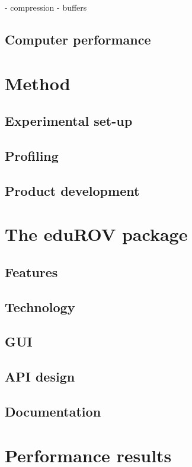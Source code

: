 \documentclass[b5paper,10pt,twoside]{book}
\begin{document}
{{- compression
- buffers
}
\section{Computer performance}

\chapter{Method}
\section{Experimental set-up}

\section{Profiling}
\section{Product development}

\chapter{The eduROV package}

\section{Features}
\section{Technology}
\section{GUI}
\section{API design}
\section{Documentation}

\chapter{Performance results}
}
\end{document}
